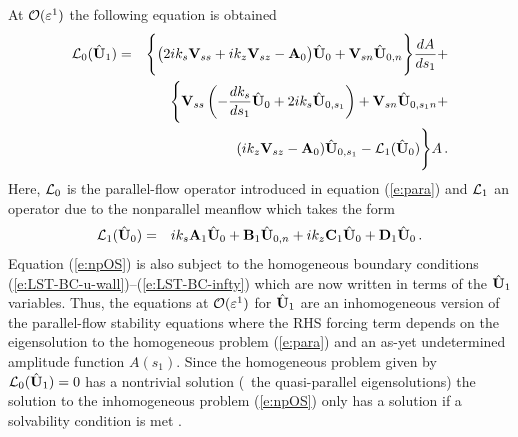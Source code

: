 At ${\cal O}(\varepsilon^1)$ the following equation is obtained
%
\begin{eqnarray} \label{e:npOS}
  {\cal L}_0({\hat{\bf U}}_1) &=& \Biggl\{ \bigl(2 i k_s {{\bf V}_{ss}} + i k_z {{\bf V}_{sz}} - {\bf A}_0 \bigr) 
       {\hat{\bf U}}_0 + {{\bf V}_{sn}} {\hat{\bf U}}_{0,n} \Biggr\} \frac{dA}{ds_1} + \nonumber \\
  & &  \Biggl\{ {{\bf V}_{ss}}\left( - \frac{dk_s}{ds_1} {\hat{\bf U}}_0 + 
       2 i k_s {\hat{\bf U}}_{0,s_1} \right) + {{\bf V}_{sn}} {\hat{\bf U}}_{0,s_1 n} + \\
  & & (i k_z {{\bf V}_{sz}} - {\bf A}_0) {\hat{\bf U}}_{0,s_1} - {\cal L}_1({\hat{\bf U}}_0) \Biggr\} A  {\, .}
\end{eqnarray}
%
Here, ${\cal L}_0$ is the parallel-flow operator introduced in equation
(\ref{e:para}) and ${\cal L}_1$ an operator due to the nonparallel meanflow which
takes the form
%
\begin{eqnarray} \label{e:npcorr}
  {\cal L}_1({\hat{\bf U}}_0) &=& i k_s {\bf A}_1 {\hat{\bf U}}_0 + {\bf B}_1 {\hat{\bf U}}_{0,n} + 
                   i k_z {\bf C}_1 {\hat{\bf U}}_0 + {\bf D}_1 {\hat{\bf U}}_0  {\, .}
\end{eqnarray}
%
Equation (\ref{e:npOS}) is also subject to the homogeneous boundary conditions
(\ref{e:LST-BC-u-wall})--(\ref{e:LST-BC-infty}) which are now written in terms
of the ${\hat{\bf U}}_1$ variables.  Thus, the equations at ${\cal O}(\varepsilon^1)$ for ${\hat{\bf U}}_1$
are an inhomogeneous version of the parallel-flow stability equations where
the RHS forcing term depends on the eigensolution to the homogeneous problem
(\ref{e:para}) and an as-yet undetermined amplitude function $A(s_1)$.  Since
the homogeneous problem given by ${\cal L}_0({\hat{\bf U}}_1) = 0$ has a nontrivial
solution (\ie\ the quasi-parallel eigensolutions) the solution to the
inhomogeneous problem (\ref{e:npOS}) only has a solution if a solvability
condition is met \cite{SaNa:75}.

